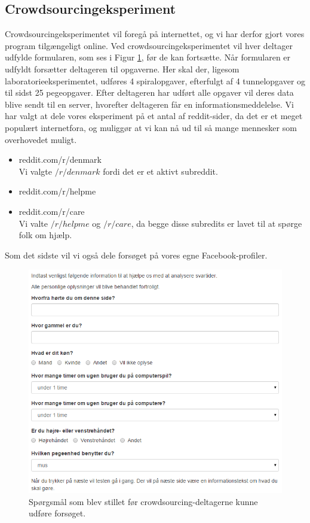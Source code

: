 \subsection*{Crowdsourcingeksperiment}
Crowdsourcingeksperimentet vil foregå på internettet, og vi har derfor gjort vores program tilgængeligt online. Ved crowdsourcingeksperimentet vil hver deltager udfylde formularen, som ses i Figur \ref{fig:Questions}, før de kan fortsætte. Når formularen er udfyldt forsætter deltageren til opgaverne. Her skal der, ligesom laboratorieeksperimentet, udføres 4 spiralopgaver, efterfulgt af 4 tunnelopgaver og til sidst 25 pegeopgaver. Efter deltageren har udført alle opgaver vil deres data blive sendt til en server, hvorefter deltageren får en informationsmeddelelse.
Vi har valgt at dele vores eksperiment på et antal af reddit-sider, da det er et meget populært internetfora, og muliggør at vi kan nå ud til så mange mennesker som overhovedet muligt.
\begin{itemize}
\item reddit.com/r/denmark\\
Vi valgte $/r/denmark$ fordi det er et aktivt subreddit.
\item reddit.com/r/helpme\\
\item reddit.com/r/care\\
Vi valte $/r/helpme$ og $/r/care$, da begge disse subredits er lavet til at spørge folk om hjælp.
\end{itemize}

Som det sidste vil vi også dele forsøget på vores egne Facebook-profiler.
\begin{figure}[h]
\centering
\includegraphics[scale=0.7]{billeder/Questions.png}
\caption{Spørgsmål som blev stillet før crowdsourcing-deltagerne kunne udføre forsøget.}
\label{fig:Questions}
\end{figure}

